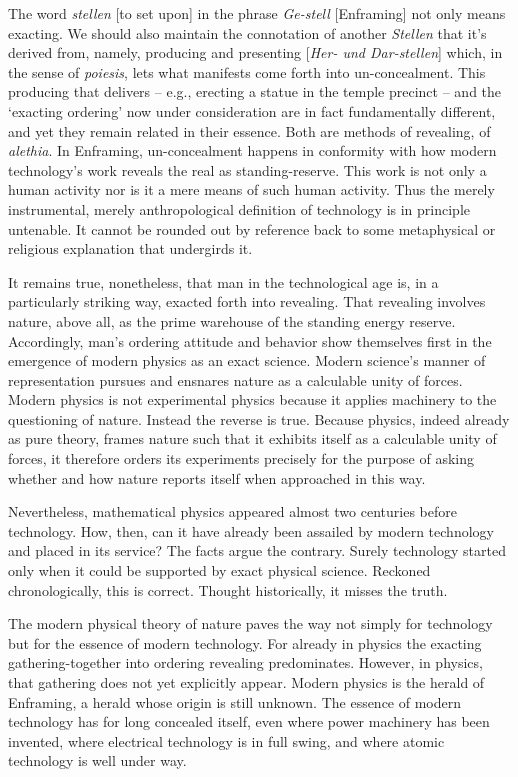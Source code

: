 \documentclass[paper=a4, fontsize=11pt,twoside]{scrartcl}
\begin{document}
The word \textit{stellen} [to set upon] in the phrase \textit{Ge-stell} [Enframing] not only means exacting. We should also maintain the connotation of another \textit{Stellen} that it's derived from, namely, producing and presenting [\textit{Her- und Dar-stellen}] which, in the sense of \textit{poi{\-e}sis}, lets what manifests come forth into un-concealment. This producing that delivers -- e.g., erecting a statue in the temple precinct -- and the `exacting ordering' now under consideration are in fact fundamentally different, and yet they remain related in their essence. Both are methods of revealing, of \textit{al{\-e}thia}. In Enframing, un-concealment happens in conformity with how modern technology's work reveals the real as standing-reserve. This work is not only a human activity nor is it a mere means of such human activity. Thus the merely instrumental, merely anthropological definition of technology is in principle untenable. It cannot be rounded out by reference back to some metaphysical or religious explanation that undergirds it.

It remains true, nonetheless, that man in the technological age is, in a particularly striking way, exacted forth into revealing. That revealing involves nature, above all, as the prime warehouse of the standing energy reserve. Accordingly, man's ordering attitude and behavior show themselves first in the emergence of modern physics as an exact science. Modern science's manner of representation pursues and ensnares nature as a calculable unity of forces. Modern physics is not experimental physics because it applies machinery to the questioning of nature. Instead the reverse is true. Because physics, indeed already as pure theory, frames nature such that it exhibits itself as a calculable unity of forces, it therefore orders its experiments precisely for the purpose of asking whether and how nature reports itself when approached in this way.

Nevertheless, mathematical physics appeared almost two centuries before technology. How, then, can it have already been assailed by modern technology and placed in its service? The facts argue the contrary. Surely technology started only when it could be supported by exact physical science. Reckoned chronologically, this is correct. Thought historically, it misses the truth.

The modern physical theory of nature paves the way not simply for technology but for the essence of modern technology. For already in physics the exacting gathering-together into ordering revealing predominates. However, in physics, that gathering does not yet explicitly appear. Modern physics is the herald of Enframing, a herald whose origin is still unknown. The essence of modern technology has for long concealed itself, even where power machinery has been invented, where electrical technology is in full swing, and where atomic technology is well under way.
\end{document}

